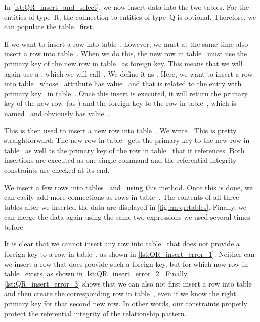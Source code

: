 In \cref{lst:QR_insert_and_select}, we now insert data into the two tables.
For the entities of type~R, the connection to entities of type~Q is optional.
Therefore, we can populate the table~ first.

If we want to insert a row into table~, however, we must at the same time also insert a row into table~.
When we do this, the new row in table~ must use the primary key of the new row in table~ as foreign key.
This means that we will again use a , which we will call~.
We define it as .
Here, we want to insert a row into table~ whose ~attribute has value~ and that is related to the entry with primary key~ in table~.
Once this insert is executed, it will return the primary key of the new row~(as ) and the foreign key to the row in table~, which is named~ and obviously has value~.%
%
\begin{sloppypar}%
This  is then used to insert a new row into table~.
We write .
This is pretty straightforward:
The new row in table~ gets the primary key to the new row in table~ as well as the primary key of the row in table~ that it references.
Both insertions are executed as one single command and the referential integrity constraints are checked at its end.%
\end{sloppypar}%
%
We insert a few rows into tables~ and~ using this method.
Once this is done, we can easily add more connections as rows in table~.
The contents of all three tables after we inserted the data are displayed in \cref{fig:rm:qr:tables}.
Finally, we can merge the data again using the same two  expressions we used several times before.

It is clear that we cannot insert any row into table~ that does not provide a foreign key to a row in table~, as shown in \cref{lst:QR_insert_error_1}.
Neither can we insert a row that does provide such a foreign key, but for which now row in table~ exists, as shown in \cref{lst:QR_insert_error_2}.
Finally, \cref{lst:QR_insert_error_3} shows that we can also not first insert a row into table~ and then create the corresponding row in table~, even if we know the right primary key for that second new row.
In other words, our constraints properly protect the referential integrity of the relationship pattern.%
%
\FloatBarrier%
\endhsection%
%
